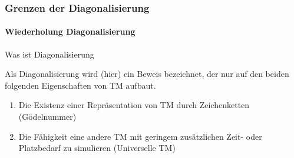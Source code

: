 
\begin{frame}
	\frametitle{Grenzen der Diagonalisierung}
	\framesubtitle{Wiederholung Diagonalisierung}
	\begin{KITinfoblock}{Was ist Diagonalisierung} {
			Als Diagonalisierung wird (hier) ein Beweis bezeichnet, der nur auf den beiden folgenden
			Eigenschaften von TM aufbaut.
			
			\begin{enumerate}
				\item<2-> Die Existenz einer Repräsentation von TM durch Zeichenketten (Gödelnummer)
				\item<3-> Die Fähigkeit eine andere TM mit geringem zusätzlichen Zeit- oder Platzbedarf zu simulieren (Universelle TM)
			\end{enumerate}		
		}
	\end{KITinfoblock}
\end{frame}

